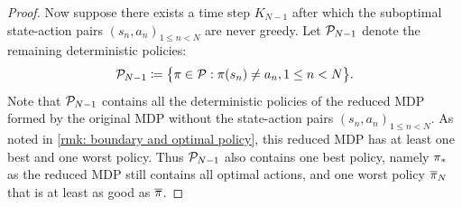 \begin{proof}


Now suppose there exists a time step $K_{N-1}$ after which the suboptimal state-action pairs $( s_n, a_n )_{1 \leq n < N}$ are never greedy.
Let $\mathcal{P}_{N-1}$ denote the remaining deterministic policies:
\begin{align*}
    \mathcal{P}_{N-1} 
    \coloneqq
    \big\{ 
    \pi \in \mathcal{P}
    :
    \pi(s_n) \neq a_n,
    1 \leq n < N
    \big\} .
\end{align*}
Note that $\mathcal{P}_{N-1}$ contains all the deterministic policies of the reduced MDP formed by the original MDP without the state-action pairs $( s_n, a_n )_{1 \leq n < N}$.
As noted in \autoref{rmk: boundary and optimal policy}, this reduced MDP has at least one best and one worst policy.
Thus $\mathcal{P}_{N-1}$ also contains one best policy, namely ${\pi}_*$ as the reduced MDP still contains all optimal actions,
and one worst policy $\overline{\pi}_N$ that is at least as good as $\overline{\pi}$.


\end{proof}
